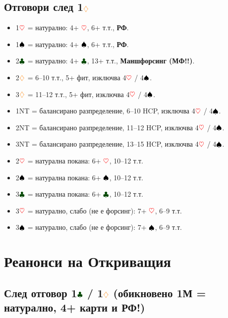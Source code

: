 \documentclass[10pt,a5paper]{extarticle}
\newcommand{\Rheart}{\textcolor{red}{\heartsuit}}
\newcommand{\Rdiamond}{\textcolor{orange}{\diamondsuit}}
\newcommand{\Bspade}{\textcolor{black}{\spadesuit}}
\newcommand{\Bclub}{\textcolor{darkgreen}{\clubsuit}}
\begin{document}
\subsection*{Отговори след 1$\Rdiamond$}
\begin{itemize}
  \item[] 1$\Rheart$ = натурално: 4+ $\Rheart$, 6+ т.т., \textbf{РФ}.
  \item[] 1$\Bspade$ = натурално: 4+ $\Bspade$, 6+ т.т., \textbf{РФ}.
  \item[] 2$\Bclub$ = натурално: 4+ $\Bclub$, 13+ т.т., \textbf{Маншфорсинг (МФ!!)}.
  \item[] 2$\Rdiamond$ = 6–10 т.т., 5+ фит, изключва 4$\Rheart$ / 4$\Bspade$.
  \item[] 3$\Rdiamond$ = 11–12 т.т., 5+ фит, изключва 4$\Rheart$ / 4$\Bspade$.
  \item[] 1NT = балансирано разпределение, 6–10 HCP, изключва 4$\Rheart$ / 4$\Bspade$.
  \item[] 2NT = балансирано разпределение, 11–12 HCP, изключва 4$\Rheart$ / 4$\Bspade$.
  \item[] 3NT = балансирано разпределение, 13–15 HCP, изключва 4$\Rheart$ / 4$\Bspade$.
  \item[] 2$\Rheart$ = натурална покана: 6+ $\Rheart$, 10–12 т.т.
  \item[] 2$\Bspade$ = натурална покана: 6+ $\Bspade$, 10–12 т.т.
  \item[] 3$\Bclub$ = натурална покана: 6+ $\Bclub$, 10–12 т.т.
  \item[] 3$\Rheart$ = натурално, слабо (не е форсинг): 7+ $\Rheart$, 6–9 т.т.
  \item[] 3$\Bspade$ = натурално, слабо (не е форсинг): 7+ $\Bspade$, 6–9 т.т.
\end{itemize}
\newpage
\section{Реанонси на Откриващия}

\subsection*{След отговор 1$\Bclub$ / 1$\Rdiamond$ (обикновено 1М = натурално, 4+ карти и РФ!)}
\end{document}
